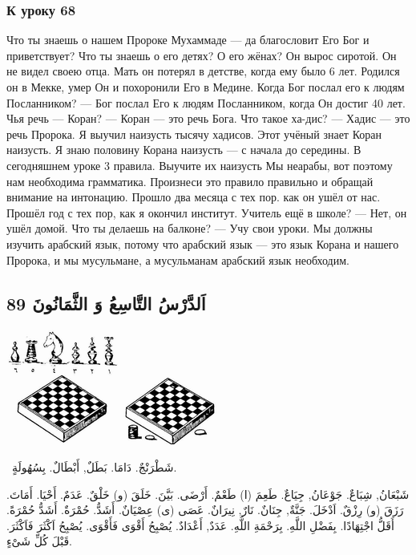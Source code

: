 \documentclass[a5paper]{article}
\begin{document}
\subsubsection{К уроку 68}
Что ты знаешь о нашем Пророке Мухаммаде — да благословит Его Бог и приветствует? Что ты знаешь о его детях? О его жёнах? Он вырос сиротой. Он не видел своею отца. Мать он потерял в детстве, когда ему было 6 лет. Родился он в Мекке, умер Он и похоронили Его в Медине. Когда Бог послал его к людям Посланником? — Бог послал Его к людям Посланником, когда Он достиг 40 лет. Чья речь — Коран? — Коран — это речь Бога. Что такое ха-дис? — Хадис — это речь Пророка. Я выучил наизусть тысячу хадисов. Этот учёный знает Коран наизусть. Я знаю половину Корана наизусть — с начала до середины. В сегодняшнем уроке 3 правила. Выучите их наизусть Мы неарабы, вот поэтому нам необходима грамматика. Произнеси это правило правильно и обращай внимание на интонацию. Прошло два месяца с тех пор. как он ушёл от нас. Прошёл год с тех пор, как я окончил институт. Учитель ещё в шко­ле? — Нет, он ушёл домой. Что ты делаешь на балконе? — Учу свои уроки. Мы должны изучить арабский язык, потому что арабский язык — это язык Корана и нашего Пророка, и мы мусульмане, а мусульманам арабский язык необходим.

\subsection[اَلدَّرْسُ التَّاسِعُ وَ الثَّمَانُونَ 89]{اَلدَّرْسُ التَّاسِعُ وَ الثَّمَانُونَ 89}
 \includegraphics[width=1.448in,height=1.5in]{MuhammadBagauddinlatinized-img251.png}   \includegraphics[width=1.2602in,height=0.8957in]{MuhammadBagauddinlatinized-img252.png} 

\ شَطْرَنْجٌ. دَامَا. بَطَلٌ, أَبْطَالٌ. بِسُهُولَةٍ. 

شَبْعَانُ, شِبَاعٌ. جَوْعَانُ, جِيَاعٌ. طَعِمَ (ا) طَعْمٌ. أَرْضَى. بَيَّنَ. خَلَقَ (و) خَلْقٌ. عَدَمٌ. أَحْيَا. أَمَاتَ. رَزَقَ (و) رِزْقٌ. اَدْخَلَ. جَنَّةٌ, جِنَانٌ. نَارٌ, نِيرَانٌ. عَصَى (ى) عِصْيَانٌ. أَشَدُّ. حُمْرَةٌ. أَشَدُّ حُمْرَةً. أَقَلُّ اجْتِهَادًا. بِفَضْلِ اللَّهِ. بِرَحْمَةِ اللَّهِ. عَدَدٌ, أَعْدَادٌ. يُصْبِحُ أَقْوَى فَأَقْوَى. يُصْبِحُ اَكْثَرَ فَاَكْثَرَ. قَبْلَ كُلِّ شَىْءٍ.
\end{document}
